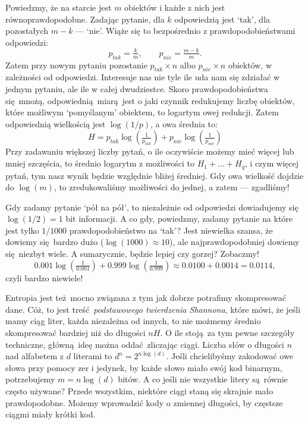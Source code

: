 \documentclass[10pt,a4paper]{article}
\begin{document}
Powiedzmy, że na starcie jest $m$ obiektów i każde z nich jest równoprawdopodobne.
Zadając pytanie, dla $k$ odpowiedzią jest `tak', dla pozostałych $m-k$ --- `nie'.
Wiąże się to bezpośrednio z prawdopodobieństwami odpowiedzi:
%
\begin{equation}
    p_{tak} = \tfrac{k}{m}, \qquad p_{nie} = \tfrac{m-k}{m}.
\end{equation}
%
Zatem przy nowym pytaniu pozostanie $p_{tak} \times n$ albo $p_{nie} \times n$ obiektów, w zależności od odpowiedzi.
Interesuje nas nie tyle ile uda nam się zdziałać w jednym pytaniu, ale ile w całej dwudziestce.
Skoro prawdopodobieństwa się mnożą, odpowiednią miarą jest o jaki czynnik redukujemy liczbę obiektów, które możliwym `pomyślanym' obiektem, to logartym owej redukcji.
Zatem odpowiednią wielkością jest $\log(1/p)$, a owa średnia to:
%
\begin{equation}
    H = p_{tak} \log \left(\tfrac{1}{p_{tak}} \right) + p_{nie} \log \left(\tfrac{1}{p_{nie}} \right)
\end{equation}
%
Przy zadawaniu większej liczby pytań, o ile oczywiście możemy mieć więcej lub mniej szczęścia, to średnio logarytm z możliwości to $H_1 + \ldots + H_{q}$, i czym więcej pytań, tym nasz wynik będzie względnie bliżej średniej. 
Gdy owa wielkość dojdzie do $\log(m)$, to zredukowaliśmy możliwości do jednej, a zatem --- zgadliśmy!

Gdy zadamy pytanie `pół na pół', to niezależnie od odpowiedzi dowiadujemy się $\log(1/2)=1$ bit informacji.
A co gdy, powiedzmy, zadamy pytanie na które jest tylko $1/1000$ prawdopodobieństwo na `tak'?
Jest niewielka szansa, że dowiemy się bardzo dużo ($\log(1000)\approx 10$), ale najprawdopodobniej dowiemy się niezbyt wiele.
A sumarycznie, będzie lepiej czy gorzej? Zobaczmy!
%
\begin{equation}
    0.001 \log(\tfrac{1}{0.001}) + 0.999 \log(\tfrac{1}{0.999})\approx 0.0100 + 0.0014 = 0.0114,
\end{equation}
%
czyli bardzo niewiele!

Entropia jest też mocno związana z tym jak dobrze potrafimy skompresować dane.
Cóż, to jest treść \emph{podstawowego twierdzenia Shannona}, które mówi, że jeśli mamy ciąg liter,
każda niezależna od innych, to nie możmemy średnio skompresować bardziej niż do długości $n H$.
O ile stoją za tym pewne szczegóły techniczne, główną ideę można oddać zliczając ciągi.
Liczba słów o długości $n$ nad alfabetem z $d$ literami to $d^n=2^{n \log(d)}$.
Jeśli chcielibyśmy zakodować owe słowa przy pomocy zer i jedynek,
by każde słowo miało swój kod binarnym, potrzebujemy $m = n \log(d)$ bitów.
A co jeśli nie wszystkie litery są równie często używane?
Przede wszystkim, niektóre ciągi staną się skrajnie mało prawdopodobne.
Możemy wprowadzić kody o zmiennej długości, by częstsze ciągmi miały krótki kod.
\end{document}
